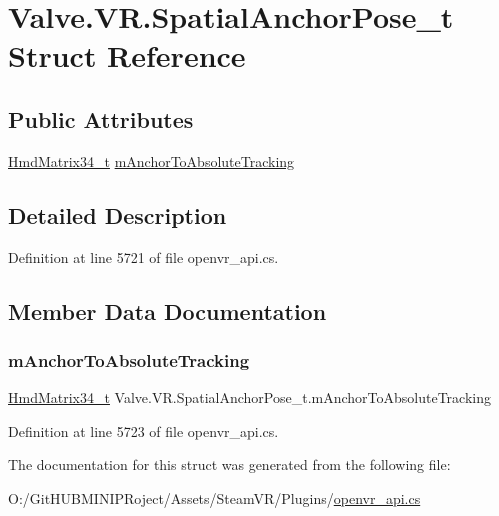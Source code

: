 \hypertarget{struct_valve_1_1_v_r_1_1_spatial_anchor_pose__t}{}\section{Valve.\+V\+R.\+Spatial\+Anchor\+Pose\+\_\+t Struct Reference}
\label{struct_valve_1_1_v_r_1_1_spatial_anchor_pose__t}
\subsection*{Public Attributes}
\begin{DoxyCompactItemize}
\item 
\mbox{\hyperlink{struct_valve_1_1_v_r_1_1_hmd_matrix34__t}{Hmd\+Matrix34\+\_\+t}} \mbox{\hyperlink{struct_valve_1_1_v_r_1_1_spatial_anchor_pose__t_a408bdabcbe71a60eb98fc3a13d7e50fc}{m\+Anchor\+To\+Absolute\+Tracking}}
\end{DoxyCompactItemize}


\subsection{Detailed Description}


Definition at line 5721 of file openvr\+\_\+api.\+cs.



\subsection{Member Data Documentation}
\mbox{\label{struct_valve_1_1_v_r_1_1_spatial_anchor_pose__t_a408bdabcbe71a60eb98fc3a13d7e50fc}} 
\subsubsection{\texorpdfstring{mAnchorToAbsoluteTracking}{mAnchorToAbsoluteTracking}}
{\footnotesize\ttfamily \mbox{\hyperlink{struct_valve_1_1_v_r_1_1_hmd_matrix34__t}{Hmd\+Matrix34\+\_\+t}} Valve.\+V\+R.\+Spatial\+Anchor\+Pose\+\_\+t.\+m\+Anchor\+To\+Absolute\+Tracking}



Definition at line 5723 of file openvr\+\_\+api.\+cs.



The documentation for this struct was generated from the following file\+:\begin{DoxyCompactItemize}
\item 
O\+:/\+Git\+H\+U\+B\+M\+I\+N\+I\+P\+Roject/\+Assets/\+Steam\+V\+R/\+Plugins/\mbox{\hyperlink{openvr__api_8cs}{openvr\+\_\+api.\+cs}}\end{DoxyCompactItemize}
